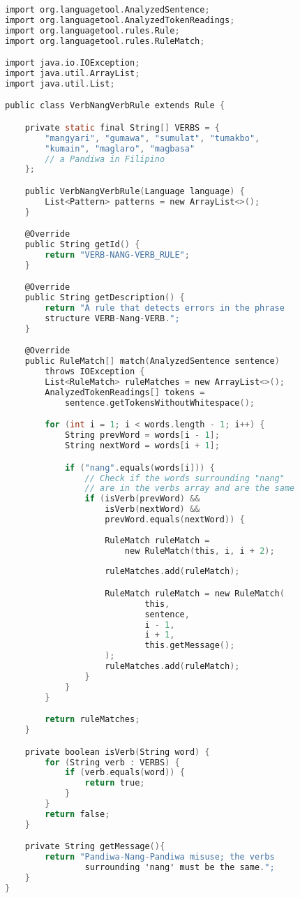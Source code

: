 \begin{lstlisting}[language=C, caption=Implementation of Pandiwa-Nang-Pandiwa Grammar Rule in Java]
import org.languagetool.AnalyzedSentence;
import org.languagetool.AnalyzedTokenReadings;
import org.languagetool.rules.Rule;
import org.languagetool.rules.RuleMatch;

import java.io.IOException; 
import java.util.ArrayList;
import java.util.List;

public class VerbNangVerbRule extends Rule {

    private static final String[] VERBS = {
        "mangyari", "gumawa", "sumulat", "tumakbo", 
        "kumain", "maglaro", "magbasa"  
        // a Pandiwa in Filipino
    };

    public VerbNangVerbRule(Language language) {
        List<Pattern> patterns = new ArrayList<>();
    }

    @Override
    public String getId() {
        return "VERB-NANG-VERB_RULE";
    }

    @Override
    public String getDescription() {
        return "A rule that detects errors in the phrase 
        structure VERB-Nang-VERB.";
    }

    @Override
    public RuleMatch[] match(AnalyzedSentence sentence) 
        throws IOException {
        List<RuleMatch> ruleMatches = new ArrayList<>();
        AnalyzedTokenReadings[] tokens = 
            sentence.getTokensWithoutWhitespace();

        for (int i = 1; i < words.length - 1; i++) {
            String prevWord = words[i - 1];
            String nextWord = words[i + 1];

            if ("nang".equals(words[i])) {
                // Check if the words surrounding "nang" 
                // are in the verbs array and are the same
                if (isVerb(prevWord) && 
                    isVerb(nextWord) && 
                    prevWord.equals(nextWord)) {
                    
                    RuleMatch ruleMatch = 
                        new RuleMatch(this, i, i + 2);
                    
                    ruleMatches.add(ruleMatch);

                    RuleMatch ruleMatch = new RuleMatch(
                            this,
                            sentence,
                            i - 1,
                            i + 1,
                            this.getMessage();
                    );
                    ruleMatches.add(ruleMatch);
                }
            }
        }

        return ruleMatches;
    }

    private boolean isVerb(String word) {
        for (String verb : VERBS) {
            if (verb.equals(word)) {
                return true;
            }
        }
        return false;
    }

    private String getMessage(){
        return "Pandiwa-Nang-Pandiwa misuse; the verbs 
                surrounding 'nang' must be the same.";
    }
}
\end{lstlisting}

